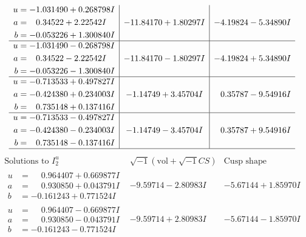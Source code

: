 \documentclass[1p]{elsarticle_modified}
\theoremstyle{definition}
\newcommand{\I}{\sqrt{-1}}
\begin{document}
$$\begin{array}{c|c|c}
\begin{aligned}
u &= -1.031490 + 0.268798 I \\
a &= \phantom{-}0.34522 + 2.22542 I \\
b &= -0.053226 + 1.300840 I\end{aligned}
 & -11.84170 + 1.80297 I & -4.19824 - 5.34890 I \\ \hline\begin{aligned}
u &= -1.031490 - 0.268798 I \\
a &= \phantom{-}0.34522 - 2.22542 I \\
b &= -0.053226 - 1.300840 I\end{aligned}
 & -11.84170 - 1.80297 I & -4.19824 + 5.34890 I \\ \hline\begin{aligned}
u &= -0.713533 + 0.497827 I \\
a &= -0.424380 + 0.234003 I \\
b &= \phantom{-}0.735148 + 0.137416 I\end{aligned}
 & -1.14749 + 3.45704 I & \phantom{-}0.35787 - 9.54916 I \\ \hline\begin{aligned}
u &= -0.713533 - 0.497827 I \\
a &= -0.424380 - 0.234003 I \\
b &= \phantom{-}0.735148 - 0.137416 I\end{aligned}
 & -1.14749 - 3.45704 I & \phantom{-}0.35787 + 9.54916 I\\
 \hline 
 \end{array}$$\newpage$$\begin{array}{c|c|c}  
\text{Solutions to }I^u_{2}& \I (\text{vol} + \sqrt{-1}CS) & \text{Cusp shape}\\
 \hline 
\begin{aligned}
u &= \phantom{-}0.964407 + 0.669877 I \\
a &= \phantom{-}0.930850 + 0.043791 I \\
b &= -0.161243 + 0.771524 I\end{aligned}
 & -9.59714 - 2.80983 I & -5.67144 + 1.85970 I \\ \hline\begin{aligned}
u &= \phantom{-}0.964407 - 0.669877 I \\
a &= \phantom{-}0.930850 - 0.043791 I \\
b &= -0.161243 - 0.771524 I\end{aligned}
 & -9.59714 + 2.80983 I & -5.67144 - 1.85970 I \\ \hline\begin{aligned}

\end{aligned}
\end{array}$$
\end{document}

